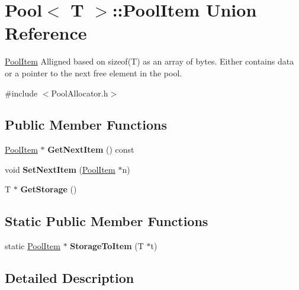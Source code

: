 \hypertarget{unionPool_1_1PoolItem}{}\section{Pool$<$ T $>$\+:\+:Pool\+Item Union Reference}
\label{unionPool_1_1PoolItem}


\hyperlink{unionPool_1_1PoolItem}{Pool\+Item} Alligned based on sizeof(\+T) as an array of bytes. Either contains data or a pointer to the next free element in the pool.  




{\ttfamily \#include $<$Pool\+Allocator.\+h$>$}

\subsection*{Public Member Functions}
\begin{DoxyCompactItemize}
\item 
\mbox{\label{unionPool_1_1PoolItem_a729e56569dacf839b1bf104288de23e5}} 
\hyperlink{unionPool_1_1PoolItem}{Pool\+Item} $\ast$ {\bfseries Get\+Next\+Item} () const
\item 
\mbox{\label{unionPool_1_1PoolItem_adf8a28c29d711a0415ed087f8953207c}} 
void {\bfseries Set\+Next\+Item} (\hyperlink{unionPool_1_1PoolItem}{Pool\+Item} $\ast$n)
\item 
\mbox{\label{unionPool_1_1PoolItem_a7f72696a81a83b77e079f636e8d29f97}} 
T $\ast$ {\bfseries Get\+Storage} ()
\end{DoxyCompactItemize}
\subsection*{Static Public Member Functions}
\begin{DoxyCompactItemize}
\item 
\mbox{\label{unionPool_1_1PoolItem_a15c57bc7bbf5d1ea916100d5b642b3a7}} 
static \hyperlink{unionPool_1_1PoolItem}{Pool\+Item} $\ast$ {\bfseries Storage\+To\+Item} (T $\ast$t)
\end{DoxyCompactItemize}


\subsection{Detailed Description}
